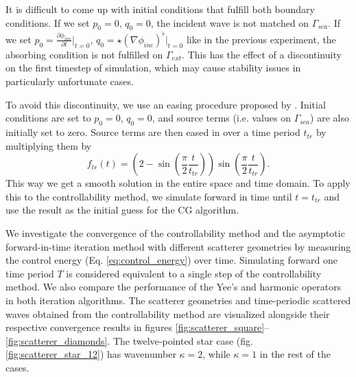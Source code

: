 \documentclass[utf8,english]{gradu3}
\begin{document}
It is difficult to come up with initial conditions
that fulfill both boundary conditions. 
If we set $p_0 = 0$, $q_0 = 0$, the incident wave is not matched on $\Gamma_{sca}$.
If we set $p_0 = \frac{\partial \phi_{inc}}{\partial t} \Big|_{t=0}$,
$q_0 = \star (\nabla \phi_{inc})^{\flat} \Big|_{t=0}$
like in the previous experiment, the absorbing condition
is not fulfilled on $\Gamma_{ext}$.
This has the effect of a discontinuity on the first timestep of simulation,
which may cause stability issues in particularly unfortunate cases.

To avoid this discontinuity, we use an easing procedure
proposed by \textcite{mur_finite-element_1993}.
Initial conditions are set to $p_0 = 0$, $q_0 = 0$,
and source terms (i.e. values on $\Gamma_{sca}$)
are also initially set to zero.
Source terms are then eased in over a time period $t_{tr}$
by multiplying them by
\begin{equation}\label{eq:mur_transition}
  f_{tr}(t) = (2 - \sin(\frac{\pi}{2} \frac{t}{t_{tr}}))\sin(\frac{\pi}{2} \frac{t}{t_{tr}}).
\end{equation}
This way we get a smooth solution in the entire space and time domain.
To apply this to the controllability method,
we simulate forward in time until $t = t_{tr}$
and use the result as the initial guess for the CG algorithm.

We investigate the convergence of the controllability method
and the asymptotic forward-in-time iteration method
with different scatterer geometries
by measuring the control energy (Eq. \eqref{eq:control_energy}) over time.
Simulating forward one time period $T$ is considered equivalent
to a single step of the controllability method.
We also compare the performance of the Yee's and harmonic operators
in both iteration algorithms.
The scatterer geometries and time-periodic scattered waves
obtained from the controllability method are visualized 
alongside their respective convergence results in figures
\ref{fig:scatterer_square}--\ref{fig:scatterer_diamonds}.
The twelve-pointed star case (fig. \ref{fig:scatterer_star_12})
has wavenumber $\kappa = 2$, while $\kappa = 1$ in the rest of the cases.
\end{document}
